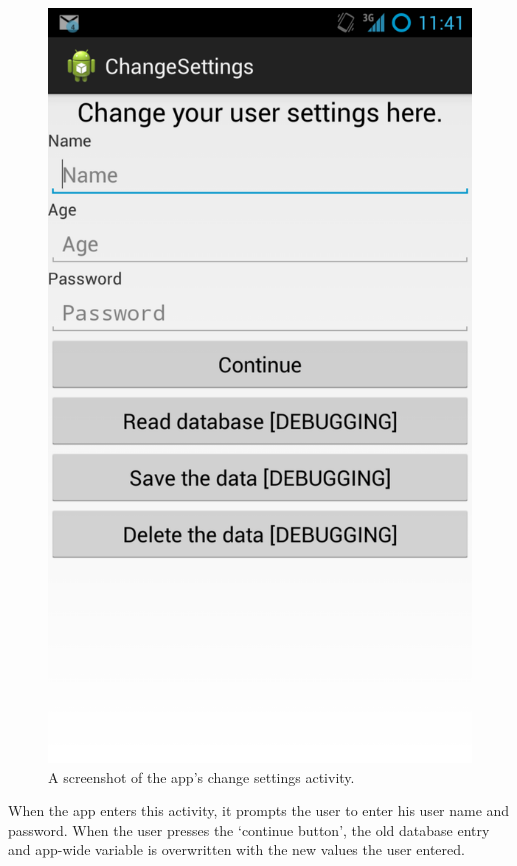 \begin{figure}
 \centering 
 \includegraphics[clip = true, trim = 0 320 0 60,
 scale=0.2]{change_settings}
 \caption{A screenshot of the app's change settings activity.}
 \label{fig:change-settings-screenshot}
\end{figure}

When the app enters this activity, it prompts the user to enter his user
name and password. When the user presses the `continue button', the old database
entry and app-wide variable is overwritten with the new values the user entered.

